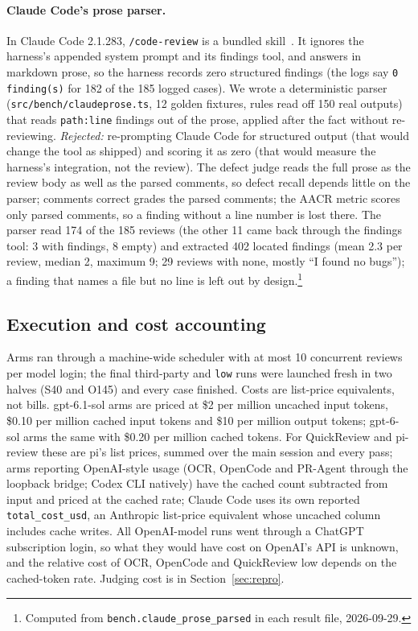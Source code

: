 \documentclass[11pt,a4paper]{article}
\newcommand{\qcr}{QuickReview}
\newcommand{\code}[1]{\texttt{#1}}
\begin{document}
\paragraph{Claude Code's prose parser.} In Claude Code 2.1.283,
\code{/code-review} is a bundled skill~\cite{claudecode}. It ignores the
harness's appended system prompt and its findings tool, and answers in
markdown prose, so the harness records zero structured findings (the logs
say \code{0 finding(s)} for 182 of the 185 logged cases). We wrote a
deterministic parser (\code{src/bench/claudeprose.ts}, 12 golden fixtures,
rules read off 150 real outputs) that reads \code{path:line} findings out
of the prose, applied after the fact without re-reviewing.
\emph{Rejected:} re-prompting Claude Code for structured output (that would
change the tool as shipped) and scoring it as zero (that would measure the
harness's integration, not the review). The defect judge reads the full
prose as the review body as well as the parsed comments, so defect recall
depends little on the parser; comments correct grades the parsed comments;
the AACR metric scores only parsed comments, so a finding without a line
number is lost there. The parser read 174 of the 185 reviews (the other 11
came back through the findings tool: 3 with findings, 8 empty) and
extracted 402 located findings (mean 2.3 per review, median 2, maximum 9; 29
reviews with none, mostly ``I found no bugs''); a finding that names a
file but no line is left out by design.\footnote{Computed from
\code{bench.claude\_prose\_parsed} in each result file, 2026-09-29.}

\subsection{Execution and cost accounting}
\label{sec:cost-accounting}

Arms ran through a machine-wide scheduler with at most 10 concurrent
reviews per model login; the final third-party and \code{low} runs were
launched fresh in two halves (S40 and O145) and every case finished. Costs
are list-price equivalents, not bills. gpt-6.1-sol arms are priced at \$2
per million uncached input tokens, \$0.10 per million cached input tokens
and \$10 per million output tokens; gpt-6-sol arms the same with \$0.20 per
million cached tokens. For \qcr{} and pi-review these are pi's list prices,
summed over the main session and every pass; arms reporting OpenAI-style
usage (OCR, OpenCode and PR-Agent through the loopback bridge; Codex CLI
natively) have the cached count subtracted from input and priced at the
cached rate; Claude Code uses its own reported \code{total\_cost\_usd}, an
Anthropic list-price equivalent whose uncached column includes cache writes.
All OpenAI-model runs went through a ChatGPT subscription login, so what
they would have cost on OpenAI's API is unknown, and the relative cost of
OCR, OpenCode and \qcr{} low depends on the cached-token rate. Judging cost
is in Section~\ref{sec:repro}.
\end{document}

